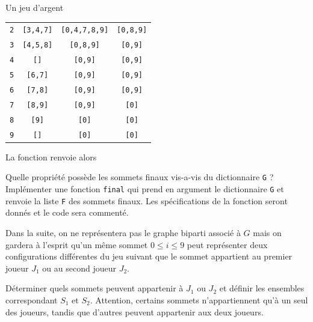 \begin{exo}[PC][1][devoir]{Un jeu d'argent}
\begin{quest}
{\begin{center}
\begin{tabular}{|c|c|c|c|}
          \texttt{2} & \texttt{[3,4,7]} & \texttt{[0,4,7,8,9]} & \texttt{[0,8,9]} \\
          \texttt{3} & \texttt{[4,5,8]} & \texttt{[0,8,9]} & \texttt{[0,9]} \\
          \texttt{4} & \texttt{[]} & \texttt{[0,9]} & \texttt{[0,9]} \\
          \texttt{5} & \texttt{[6,7]} & \texttt{[0,9]} & \texttt{[0,9]}\\
          \texttt{6} & \texttt{[7,8]} & \texttt{[0,9]} & \texttt{[0,9]} \\
          \texttt{7} & \texttt{[8,9]} & \texttt{[0,9]} & \texttt{[0]} \\
          \texttt{8} & \texttt{[9]} & \texttt{[0]} & \texttt{[0]} \\
          \texttt{9} & \texttt{[]} & \texttt{[0]} & \texttt{[0]} \\
          \hline
        \end{tabular}
       \end{center}
       La fonction renvoie alors 
        
      
    }
    \item Quelle propriété possède les sommets finaux vis-a-vis du dictionnaire \texttt{G} ? Implémenter une fonction \texttt{final} qui prend en argument le dictionnaire \texttt{G} et renvoie la liste \texttt{F} des sommets finaux. Les spécifications de la fonction seront donnés et le code sera commenté.
  \end{quest}
  Dans la suite, on ne représentera pas le graphe biparti associé à $G$ mais on gardera à l’esprit qu’un même sommet $0 \leq i \leq 9$ peut représenter deux configurations différentes du jeu suivant que le sommet appartient au premier joueur $J_1$ ou au second joueur $J_2$.
    \begin{quest}
    \item Déterminer quels sommets peuvent appartenir à $J_1$ ou $J_2$ et définir les ensembles correspondant $S_1$ et $S_2$. Attention, certains sommets n’appartiennent qu’à un seul des joueurs, tandis que d’autres peuvent appartenir aux deux joueurs.
\end{quest}
\end{exo}
